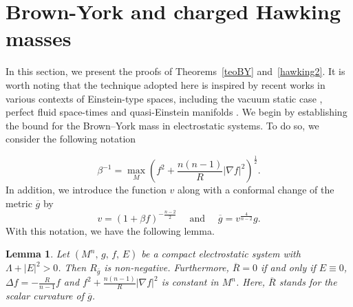 \documentclass{amsart}
\newtheorem{lemma}{Lemma}
\numberwithin{equation}{section}
\begin{document}
\section{Brown-York and charged Hawking masses}	






In this section, we present the proofs of Theorems~\ref{teoBY} and~\ref{hawking2}. It is worth noting that the technique adopted here is inspired by recent works in various contexts of Einstein-type spaces, including the vacuum static case \cite{FY,HMR,Jie,yuan}, perfect fluid space-times \cite{costa} and quasi-Einstein manifolds \cite{ernani}. We begin by establishing the bound for the Brown–York mass in electrostatic systems. To do so, we consider the following notation

$$\beta^{-1}=\displaystyle\max_{M}\left(f^{2}+\frac{n(n-1)}{R}|\nabla f|^{2}\right)^{\frac{1}{2}}.$$ In addition, we introduce the function $v$ along with a conformal change of the metric $\overline{g}$ by
	$$v=(1+\beta f)^{-\frac{n-2}{2}}\,\,\quad\mbox{and}\quad\,\,\overline{g}=v^{\frac{4}{n-2}}g.$$ With this notation, we have the following lemma. 




	\begin{lemma}\label{posit_conf}
Let $(M^n,\,g,\,f,\,E)$ be a compact electrostatic system with $\Lambda+|E|^{2}>0$. Then $R_{\bar{g}}$ is non-negative. Furthermore, $\overline{R}=0$ if and only if $E\equiv 0$, $\Delta f=-\frac{R}{n-1}f$ and $f^{2}+\frac{n(n-1)}{R}|\nabla f|^{2}$ is constant in $M^n$. Here, $\overline{R}$ stands for the scalar curvature of $\overline{g}$.
	\end{lemma}
	
\end{document}
